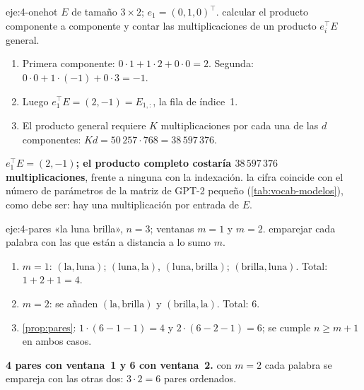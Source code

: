 \begin{solucion}{eje:4-onehot}
\datos $E$ de tamaño $3\times 2$; $e_1=(0,1,0)^{\top}$.
\planteamiento calcular el producto componente a componente y contar las multiplicaciones de un producto $e_i^{\top}E$ general.
\pasos
\begin{enumerate}[label=\arabic*.]
  \item Primera componente: $0\cdot 1+1\cdot 2+0\cdot 0=2$. Segunda: $0\cdot 0+1\cdot(-1)+0\cdot 3=-1$.
  \item Luego $e_1^{\top}E=(2,-1)=E_{1,:}$, la fila de índice~1.
  \item El producto general requiere $K$ multiplicaciones por cada una de las $d$ componentes: $Kd=50\,257\cdot 768=38\,597\,376$.
\end{enumerate}
\resultado \textbf{$e_1^{\top}E=(2,-1)$; el producto completo costaría $38\,597\,376$ multiplicaciones}, frente a ninguna con la indexación.
\comprobacion la cifra coincide con el número de parámetros de la matriz de GPT-2 pequeño (\cref{tab:vocab-modelos}), como debe ser: hay una multiplicación por entrada de $E$.
\end{solucion}

\begin{solucion}{eje:4-pares}
\datos «la luna brilla», $n=3$; ventanas $m=1$ y $m=2$.
\planteamiento emparejar cada palabra con las que están a distancia a lo sumo $m$.
\pasos
\begin{enumerate}[label=\arabic*.]
  \item $m=1$: $(\text{la},\text{luna})$; $(\text{luna},\text{la})$, $(\text{luna},\text{brilla})$; $(\text{brilla},\text{luna})$. Total: $1+2+1=4$.
  \item $m=2$: se añaden $(\text{la},\text{brilla})$ y $(\text{brilla},\text{la})$. Total: $6$.
  \item \cref{prop:pares}: $1\cdot(6-1-1)=4$ y $2\cdot(6-2-1)=6$; se cumple $n\ge m+1$ en ambos casos.
\end{enumerate}
\resultado \textbf{4 pares con ventana~1 y 6 con ventana~2.}
\comprobacion con $m=2$ cada palabra se empareja con las otras dos: $3\cdot 2=6$ pares ordenados.
\end{solucion}

